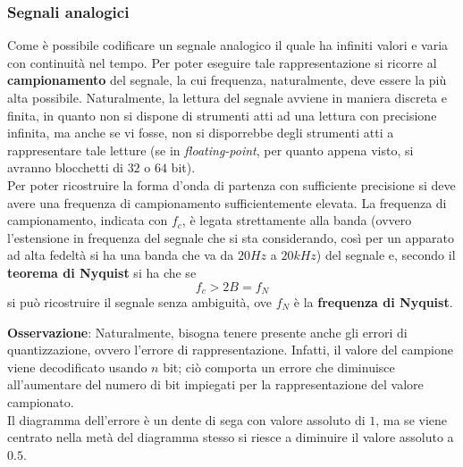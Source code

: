 \documentclass[a4paper]{extarticle}
\begin{document}
\subsubsection{Segnali analogici}
Come è possibile codificare un segnale analogico il quale ha infiniti valori e varia con continuità nel tempo. Per poter eseguire tale rappresentazione si ricorre al \textbf{campionamento} del segnale, la cui frequenza, naturalmente, deve essere la più alta possibile. Naturalmente, la lettura del segnale avviene in maniera discreta e finita, in quanto non si dispone di strumenti atti ad una lettura con precisione infinita, ma anche se vi fosse, non si disporrebbe degli strumenti atti a rappresentare tale letture (se in \textit{floating-point}, per quanto appena visto, si avranno blocchetti di \(32\) o \(64\) bit).\\
Per poter ricostruire la forma d'onda di partenza con sufficiente precisione si deve avere una frequenza di campionamento sufficientemente elevata. La frequenza di campionamento, indicata con \(f_c\), è legata strettamente alla banda (ovvero l'estensione in frequenza del segnale che si sta considerando, così per un apparato ad alta fedeltà si ha una banda che va da \(20 Hz\) a \(20 kHz\)) del segnale e, secondo il \textbf{teorema di Nyquist} si ha che se
\[f_c > 2B = f_N\]
si può ricostruire il segnale senza ambiguità, ove \(f_N\) è la \textbf{frequenza di Nyquist}.

\vspace{1em}
\noindent
\textbf{Osservazione}: Naturalmente, bisogna tenere presente anche gli errori di quantizzazione, ovvero l'errore di rappresentazione. Infatti, il valore del campione viene decodificato usando \(n\) bit; ciò comporta un errore che diminuisce all'aumentare del numero di bit impiegati per la rappresentazione del valore campionato.\\
Il diagramma dell'errore è un dente di sega con valore assoluto di \(1\), ma se viene centrato nella metà del diagramma stesso si riesce a diminuire il valore assoluto a \(0.5\).
\end{document}
